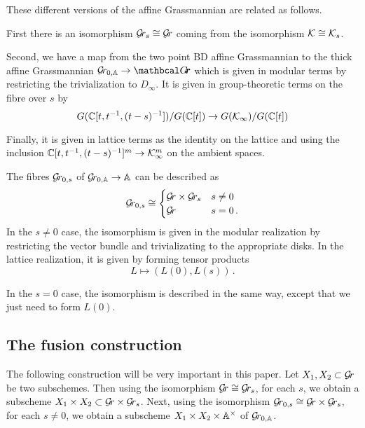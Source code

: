 \documentclass[draft]{article}
\begin{document}
These  different versions of the affine Grassmannian are related as follows.  

First there is an isomorphism $ \Gr_s \cong \Gr $ coming from the isomorphism $ \cK \cong \Ks$.

Second, we have a map from the two point BD affine Grassmannian to the thick affine Grassmannian $ \Grbd \rightarrow \Grth $
which is given in modular terms by restricting the trivialization to $ D_\infty$.  It is given in group-theoretic terms on the fibre over $ s $ by
$$
G(\CC[t, t^{-1}, (t-s)^{-1}])/ G(\CC[t]) \rightarrow G(\Kinf)/G(\CC[t])
$$

Finally, it is given in lattice terms as the identity on the lattice and using the inclusion $\CC[t, t^{-1}, (t-s)^{-1}]^m \rightarrow \Kinf^m$ on the ambient spaces.

The fibres $ \Gr_{0,s}$ of $ \Grbd \rightarrow \AA$ can be described as %
$$
\Gr_{0,s} \cong 
\begin{cases} 
    \Gr \times \Gr_s & s \ne 0 \\
    \Gr              & s = 0\,.
\end{cases}
$$
In the $s\ne 0$ case, the isomorphism is given in the modular realization by restricting the vector bundle and trivializating to the appropriate disks.  
In the lattice realization, it is given by forming tensor products 
$$
L \mapsto (L(0), L(s))\,.
$$

In the $ s = 0 $ case, the isomorphism is described in the same way, except that we just need to form $ L(0)$.



\subsection{The fusion construction}
The following construction will be very important in this paper.  Let $ X_1, X_2 \subset \Gr$ be two subschemes. Then using the isomorphism $ \Gr \cong \Gr_s $, for each $ s $, we obtain a subscheme $ X_1 \times X_2 \subset \Gr \times \Gr_s $.  
Next, using the isomorphism $ \Gr_{0,s} \cong \Gr \times \Gr_s $,  for each $ s \ne 0$, we obtain a subscheme $ X_1 \times X_2 \times \AA^\times $  of $\Grbd$.  
\end{document}
